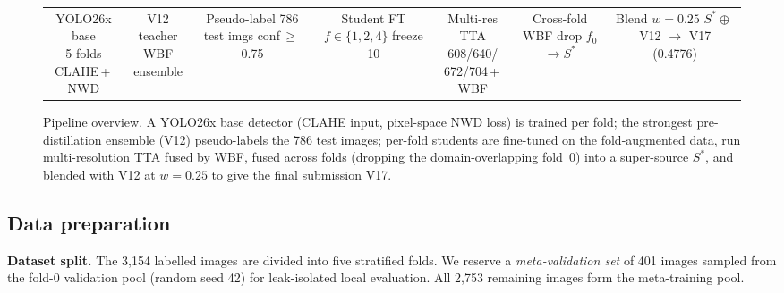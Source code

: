 \documentclass{article}
\begin{document}
\begin{figure}[t]
\centering
\setlength{\fboxsep}{3pt}
\scriptsize
\begin{tabular}{@{}c@{$\,\to\,$}c@{$\,\to\,$}c@{$\,\to\,$}c@{$\,\to\,$}c@{$\,\to\,$}c@{$\,\to\,$}c@{}}
\fbox{\parbox[c][12mm][c]{17mm}{\centering YOLO26x base\\5 folds\\CLAHE\,+\,NWD}} &
\fbox{\parbox[c][12mm][c]{15mm}{\centering V12 teacher\\WBF\\ensemble}} &
\fbox{\parbox[c][12mm][c]{17mm}{\centering Pseudo-label\\786 test imgs\\conf\,$\ge$\,0.75}} &
\fbox{\parbox[c][12mm][c]{17mm}{\centering Student FT\\$f\!\in\!\{1,2,4\}$\\freeze 10}} &
\fbox{\parbox[c][12mm][c]{18mm}{\centering Multi-res TTA\\608/640/\\672/704\,+\,WBF}} &
\fbox{\parbox[c][12mm][c]{17mm}{\centering Cross-fold WBF\\drop $f_0$\\$\to S^{*}$}} &
\fbox{\parbox[c][12mm][c]{19mm}{\centering Blend $w{=}0.25$\\$S^{*}\!\oplus$\,V12\\$\to$ V17 (0.4776)}} \\
\end{tabular}
\caption{Pipeline overview. A YOLO26x base detector (CLAHE input,
pixel-space NWD loss) is trained per fold; the strongest
pre-distillation ensemble (V12) pseudo-labels the 786 test images;
per-fold students are fine-tuned on the fold-augmented data, run
multi-resolution TTA fused by WBF, fused across folds (dropping the
domain-overlapping fold~0) into a super-source $S^{*}$, and blended
with V12 at $w{=}0.25$ to give the final submission V17.}
\label{fig:pipeline}
\end{figure}

\subsection{Data preparation}

\textbf{Dataset split.} The 3{,}154 labelled images are divided into
five stratified folds. We reserve a \emph{meta-validation set} of 401
images sampled from the fold-0 validation pool (random seed 42) for
leak-isolated local evaluation. All 2{,}753 remaining images form the
meta-training pool.
\end{document}
